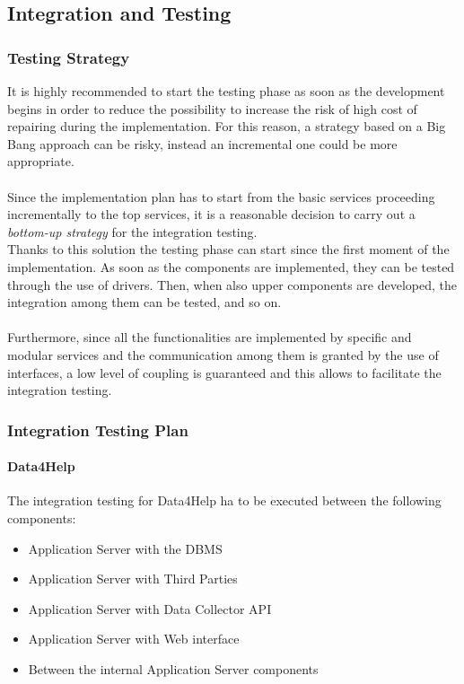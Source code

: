 \documentclass[a4paper]{article}
\begin{document}
\subsection{Integration and Testing}

\subsubsection{Testing Strategy}
It is highly recommended to start the testing phase as soon as the development begins in order to reduce the possibility to increase the risk of high cost of repairing during the implementation. For this reason, a strategy based on a Big Bang approach can be risky, instead an incremental one could be more appropriate.\\ \\
Since the implementation plan has to start from the basic services proceeding incrementally to the top services, it is a reasonable decision to carry out a \textit{bottom-up strategy} for the integration testing.\\
Thanks to this solution the testing phase can start since the first moment of the implementation. As soon as the components are implemented, they can be tested through the use of drivers. Then, when also upper components are developed, the integration among them can be tested, and so on.\\ \\
Furthermore, since all the functionalities are implemented by specific and modular services and the communication among them is granted by the use of interfaces, a low level of coupling is guaranteed and this allows to facilitate the integration testing.

\subsubsection{Integration Testing Plan}

\paragraph{Data4Help}
The integration testing for Data4Help ha to be executed between the following components:

\begin{itemize}
    \item Application Server with the DBMS
    \item Application Server with Third Parties
    \item Application Server with Data Collector API
    \item Application Server with Web interface
    \item Between the internal Application Server components
\end{itemize}
\end{document}
